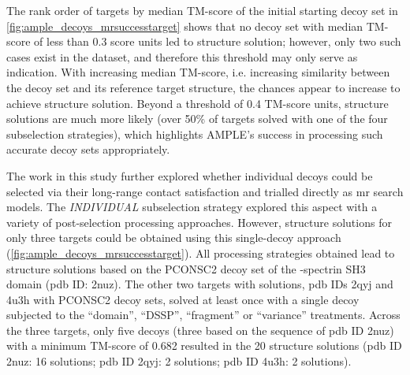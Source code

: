 The rank order of targets by median TM-score of the initial starting decoy set in \cref{fig:ample_decoys_mrsuccesstarget} shows that no decoy set with median TM-score of less than 0.3 score units led to structure solution; however, only two such cases exist in the dataset, and therefore this threshold may only serve as indication. With increasing median TM-score, i.e. increasing similarity between the decoy set and its reference target structure, the chances appear to increase to achieve structure solution. Beyond a threshold of 0.4 TM-score units, structure solutions are much more likely (over 50\% of targets solved with one of the four subselection strategies), which highlights AMPLE's success in processing such accurate decoy sets appropriately.

The work in this study further explored whether individual decoys could be selected via their long-range contact satisfaction and trialled directly as \gls{mr} search models. The \textit{INDIVIDUAL} subselection strategy explored this aspect with a variety of post-selection processing approaches. However, structure solutions for only three targets could be obtained using this single-decoy approach (\cref{fig:ample_decoys_mrsuccesstarget}). All processing strategies obtained lead to structure solutions based on the PCONSC2 decoy set of the \textalpha-spectrin SH3 domain (\gls{pdb} ID: 2nuz). The other two targets with solutions, \gls{pdb} IDs 2qyj and 4u3h with PCONSC2 decoy sets, solved at least once with a single decoy subjected to the ``domain'', ``DSSP'', ``fragment'' or ``variance'' treatments. Across the three targets, only five decoys (three based on the sequence of \gls{pdb} ID 2nuz) with a minimum TM-score of 0.682 resulted in the 20 structure solutions (\gls{pdb} ID 2nuz: 16 solutions; \gls{pdb} ID 2qyj: 2 solutions; \gls{pdb} ID 4u3h: 2 solutions).

